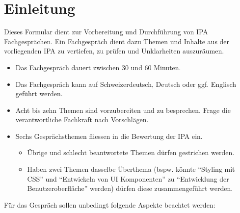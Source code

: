 \section{Einleitung}

Dieses Formular dient zur Vorbereitung und Durchführung von IPA Fachgesprächen. Ein Fachgespräch dient dazu Themen und Inhalte aus der vorliegenden IPA zu vertiefen, zu prüfen und Unklarheiten auszuräumen.

\begin{itemize}
  \item Das Fachgespräch dauert zwischen 30 und 60 Minuten.
  \item Das Fachgespräch kann auf Schweizerdeutsch, Deutsch oder ggf. Englisch geführt werden.
  \item Acht bis zehn Themen sind vorzubereiten und zu besprechen. Frage die verantwortliche Fachkraft nach Vorschlägen.
  \item Sechs Gesprächsthemen fliessen in die Bewertung der IPA ein.
  \begin{itemize}
    \item Übrige und schlecht beantwortete Themen dürfen gestrichen werden.
    \item Haben zwei Themen dasselbe Überthema (bspw. könnte \enquote{Styling mit CSS} und \enquote{Entwickeln von UI Komponenten} zu \enquote{Entwicklung der Benutzeroberfläche} werden) dürfen diese zusammengeführt werden.
  \end{itemize}
\end{itemize}

Für das Gespräch sollen unbedingt folgende Aspekte beachtet werden:

